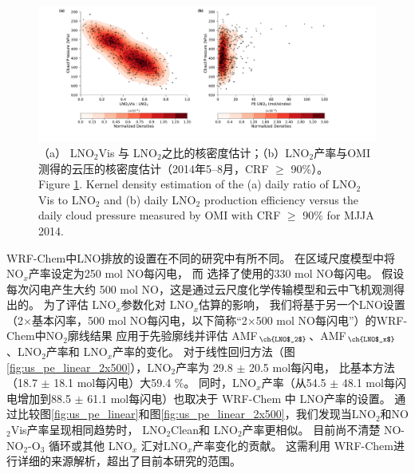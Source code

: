 \begin{figure}[!htbp]
\centering
\includegraphics[width=16cm]{./figures/us_cp_ratio_lno2.pdf}
\caption{（a） LNO$_2$Vis 与 LNO$_2$之比的核密度估计；（b）LNO$_2$产率与OMI测得的云压的核密度估计（2014年5--8月，CRF $\geq$ 90\%）。\\
Figure \ref{fig:us_cp_ratio_lno2}. Kernel density estimation of the (a) daily ratio of LNO$_2$Vis to LNO$_2$ and (b) daily LNO$_2$ production efficiency versus the daily cloud pressure measured by OMI with CRF $\geq$ 90\% for MJJA 2014.}
\label{fig:us_cp_ratio_lno2}
\end{figure}


WRF-Chem中LNO排放的设置在不同的研究中有所不同。
\citet{Zhao.2009}在区域尺度模型中将NO$_x$产率设定为250 mol NO每闪电，
而 \citet{Bela.2016}选择了\citet{Barth.2012}使用的330 mol NO每闪电。
\citet{Wang.2015a}假设每次闪电产生大约 500 mol NO，这是通过云尺度化学传输模型和云中飞机观测得出的\citep{Ott.2010}。
为了评估 LNO$_x$参数化对 LNO$_x$估算的影响，
我们将基于另一个LNO设置（2$\times$基本闪率，500 mol NO每闪电，以下简称“2$\times$500 mol NO每闪电”）的WRF-Chem中NO$_2$廓线结果
应用于先验廓线并评估 AMF$_{\ch{LNO$_2$}}$、AMF$_{\ch{LNO$_x$}}$、LNO$_2$产率和 LNO$_x$产率的变化。
对于线性回归方法（图 \ref{fig:us_pe_linear_2x500}），LNO$_2$产率为 29.8 $\pm$ 20.5 mol每闪电，
比基本方法（18.7 $\pm$ 18.1 mol每闪电）大59.4 \%。
同时，LNO$_x$产率（从54.5 $\pm$ 48.1 mol每闪电增加到88.5 $\pm$ 61.1 mol每闪电）也取决于 WRF-Chem 中 LNO产率的设置。
通过比较图\ref{fig:us_pe_linear}和图\ref{fig:us_pe_linear_2x500}，我们发现当LNO$_2$和NO$_2$Vis产率呈现相同趋势时，
LNO$_2$Clean和 LNO$_2$产率更相似。
目前尚不清楚 NO-NO$_2$-O$_3$ 循环或其他 LNO$_x$ 汇对LNO$_x$产率变化的贡献。
这需利用 WRF-Chem进行详细的来源解析，超出了目前本研究的范围。

